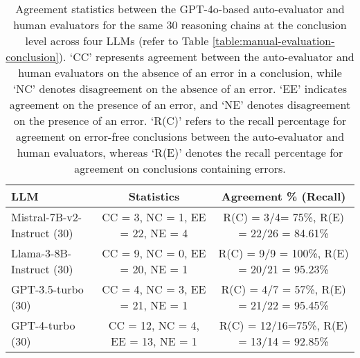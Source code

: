 \begin{table*}[!htbp]
\small
\centering
\begin{tabular}{lcc}
\toprule
LLM   & Statistics & Agreement \% (Recall) \\ 
\midrule
        Mistral-7B-v2-Instruct (30) & CC = 3, NC = 1, EE = 22, NE = 4 & R(C) = 3/4= 75\%, R(E) = 22/26 = 84.61\% \\
        Llama-3-8B-Instruct (30) & 	CC = 9, NC = 0, EE = 20, NE = 1 & R(C) = 9/9 = 100\%, R(E) = 20/21 = 95.23\% \\
        GPT-3.5-turbo (30) & 	CC = 4, NC = 3, EE = 21, NE = 1 & R(C) = 4/7 = 57\%, R(E) = 21/22 = 95.45\% \\
        GPT-4-turbo (30) & 	CC = 12, NC = 4, EE = 13, NE = 1 & R(C) = 12/16=75\%, R(E) = 13/14 = 92.85\% \\
\bottomrule
\end{tabular}
\caption{Agreement statistics between the GPT-4o-based auto-evaluator and human evaluators for the same 30 reasoning chains at the conclusion level across four LLMs (refer to Table \ref{table:manual-evaluation-conclusion}). `CC' represents agreement between the auto-evaluator and human evaluators on the absence of an error in a conclusion, while `NC' denotes disagreement on the absence of an error. `EE' indicates agreement on the presence of an error, and `NE' denotes disagreement on the presence of an error. `R(C)' refers to the recall percentage for agreement on error-free conclusions between the auto-evaluator and human evaluators, whereas `R(E)' denotes the recall percentage for agreement on conclusions containing errors.}
\label{table:auto-eval-agreement-conclusion}
\end{table*}
